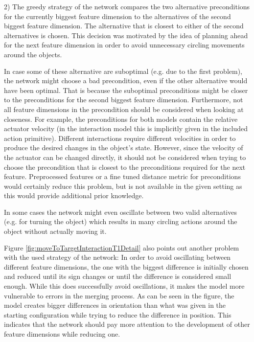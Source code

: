 2) The greedy strategy of the network compares the two alternative preconditions for the currently biggest feature dimension to the alternatives of the second biggest feature dimension. The alternative that is closest to either of the second alternatives is chosen. This decision was motivated by the idea of planning ahead for the next feature dimension in order to avoid unnecessary circling movements around the objects.

In case some of these alternative are suboptimal (e.g. due to the first problem), the network might choose a bad precondition, even if the other alternative would have been optimal. That is because the suboptimal preconditions might be closer to the preconditions for the second biggest feature dimension. 
Furthermore, not all feature dimensions in the precondition should be considered when looking at closeness. For example, the preconditions for both models contain the relative actuator velocity (in the interaction model this is implicitly given in the included action primitive). 
Different interactions require different velocities in order to produce the desired changes in the object's state. 
However, since the velocity of the actuator can be changed directly, it should not be considered when trying to choose the precondition that is closest to the preconditions required for the next feature. Preprocessed features or a fine tuned distance metric for preconditions would certainly reduce this problem, but is not available in the given setting as this would provide additional prior knowledge.

In some cases the network might even oscillate between two valid alternatives (e.g. for turning the object) which results in many circling actions around the object without actually moving it.

Figure \ref{fig:moveToTargetInteractionT1Detail} also points out another problem with the used strategy of the network: In order to avoid oscillating between different feature dimensions, the one with the biggest difference is initially chosen and reduced until its sign changes or until the difference is considered small enough. While this does successfully avoid oscillations, it makes the model more vulnerable to errors in the merging process. As can be seen in the figure, the model creates bigger differences in orientation than what was given in the starting configuration while trying to reduce the difference in position. This indicates that the network should pay more attention to the development of other feature dimensions while reducing one.

